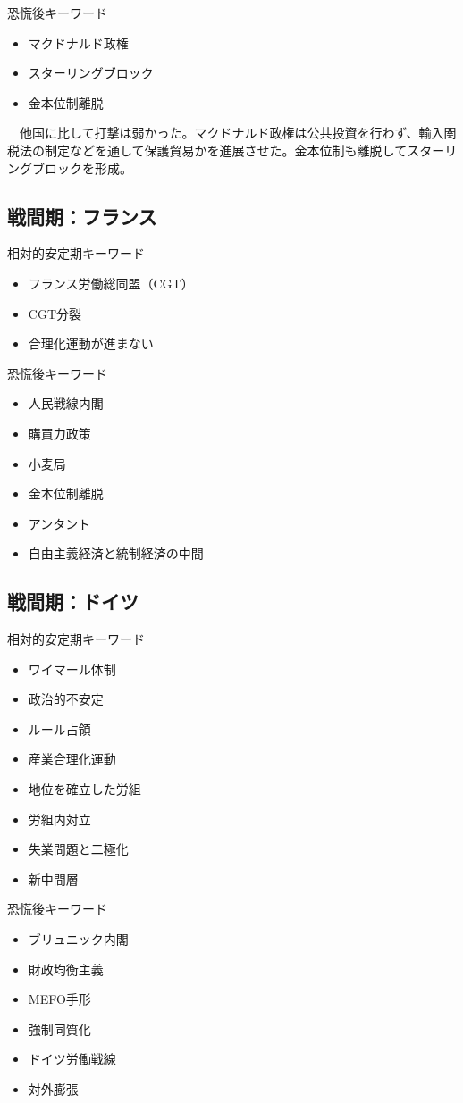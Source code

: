 \documentclass{jsarticle}
\begin{document}
恐慌後キーワード
\begin{itemize}
\item マクドナルド政権
\item スターリングブロック
\item 金本位制離脱
\end{itemize}
　他国に比して打撃は弱かった。マクドナルド政権は公共投資を行わず、輸入関税法の制定などを通して保護貿易かを進展させた。金本位制も離脱してスターリングブロックを形成。

\subsection{戦間期：フランス}
相対的安定期キーワード
\begin{itemize}
\item フランス労働総同盟（CGT）
\item CGT分裂
\item 合理化運動が進まない
\end{itemize}
恐慌後キーワード
\begin{itemize}
\item 人民戦線内閣
\item 購買力政策
\item 小麦局
\item 金本位制離脱
\item アンタント
\item 自由主義経済と統制経済の中間
\end{itemize}

\subsection{戦間期：ドイツ}
相対的安定期キーワード
\begin{itemize}
\item ワイマール体制
\item 政治的不安定
\item ルール占領
\item 産業合理化運動
\item 地位を確立した労組
\item 労組内対立
\item 失業問題と二極化
\item 新中間層
\end{itemize}
恐慌後キーワード
\begin{itemize}
\item ブリュニック内閣
\item 財政均衡主義
\item MEFO手形
\item 強制同質化
\item ドイツ労働戦線
\item 対外膨張
\end{itemize}
\end{document}
